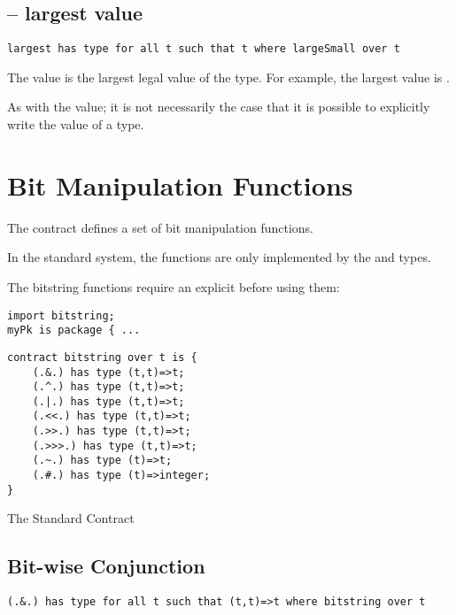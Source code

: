 \subsection{ -- largest value}
\begin{lstlisting}
largest has type for all t such that t where largeSmall over t
\end{lstlisting}

The   value is the largest legal value of the type. For example, the largest  value is .

\begin{aside}
As with the  value; it is not necessarily the case that it is possible to explicitly write the  value of a type.
\end{aside}

\section{Bit Manipulation Functions}
\label{bitString}

The  contract defines a set of bit manipulation functions.

\begin{aside}
In the standard system, the  functions are only implemented by the  and  types.
\end{aside}

\begin{aside}
The bitstring functions require an explicit  before using them:
\begin{lstlisting}
import bitstring;
myPk is package { ...
\end{lstlisting}
\end{aside}

\begin{program}
\begin{lstlisting}
contract bitstring over t is {
    (.&.) has type (t,t)=>t;
    (.^.) has type (t,t)=>t;
    (.|.) has type (t,t)=>t;
    (.<<.) has type (t,t)=>t;
    (.>>.) has type (t,t)=>t;
    (.>>>.) has type (t,t)=>t;
    (.~.) has type (t)=>t;
    (.#.) has type (t)=>integer;
}
\end{lstlisting}
\caption{The Standard  Contract\label{bitstringContractDef}}
\end{program}

\subsection{ Bit-wise Conjunction}
\label{bitAnd}
\begin{lstlisting}
(.&.) has type for all t such that (t,t)=>t where bitstring over t
\end{lstlisting}


